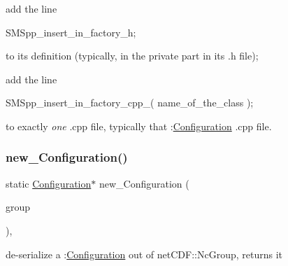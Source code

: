 \begin{DoxyItemize}
\item add the line

S\+M\+Spp\+\_\+insert\+\_\+in\+\_\+factory\+\_\+h;

to its definition (typically, in the private part in its .h file);
\item add the line

S\+M\+Spp\+\_\+insert\+\_\+in\+\_\+factory\+\_\+cpp\+\_( name\+\_\+of\+\_\+the\+\_\+class );

to exactly {\itshape one} .cpp file, typically that \+:\mbox{\hyperlink{class_s_m_spp__di__unipi__it_1_1_configuration}{Configuration}} .cpp file. 
\end{DoxyItemize}\mbox{\label{class_s_m_spp__di__unipi__it_1_1_configuration_af3e786f9d33114595e17e3704a3b9a71}} 
\subsubsection{\texorpdfstring{new\+\_\+\+Configuration()}{new\_Configuration()}\hspace{0.1cm}{\footnotesize\ttfamily [2/2]}}
{\footnotesize\ttfamily static \mbox{\hyperlink{class_s_m_spp__di__unipi__it_1_1_configuration}{Configuration}}$\ast$ new\+\_\+\+Configuration (\begin{DoxyParamCaption}\item[{net\+C\+D\+F\+::\+Nc\+Group \&\&}]{group }\end{DoxyParamCaption})\hspace{0.3cm}{\ttfamily [inline]}, {\ttfamily [static]}}



de-\/serialize a \+:\mbox{\hyperlink{class_s_m_spp__di__unipi__it_1_1_configuration}{Configuration}} out of net\+C\+D\+F\+::\+Nc\+Group, returns it 

